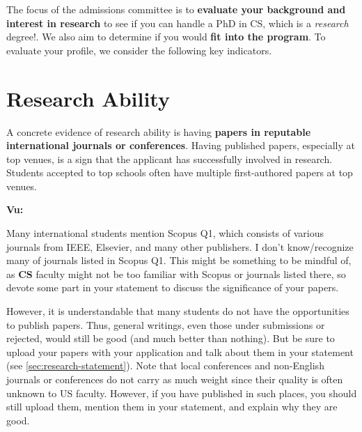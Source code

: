 \documentclass[oneside,11pt]{book}
\newenvironment{commentbox}[1][]{
  \small
  \begin{mybox}
    {\small \textbf{#1}}
  }{
  \end{mybox}
}
\begin{document}
The focus of the admissions committee is to \textbf{evaluate your background and interest in research} to see if you can handle a PhD in CS, which is a \emph{research} degree!. We also aim to determine if you would \textbf{fit into the program}. To evaluate your profile, we consider
the following key indicators.

\section{Research Ability}\label{sec:research-ability}

A concrete evidence of research ability is having \textbf{papers in reputable international journals or conferences}.
Having published papers, especially at top venues, is a sign that the applicant has successfully involved in research.  Students  accepted to top schools often have multiple first-authored papers at top venues. 

\begin{commentbox}[Vu:]
  Many international students mention Scopus Q1, which consists of various journals from IEEE, Elsevier, and many other publishers.  I don't know/recognize many of journals listed in Scopus Q1. This might be something to be mindful of, as \textbf{CS} faculty might not be too familiar with Scopus or journals listed there, so devote some part in your statement to discuss the significance of your papers.
\end{commentbox}

However, it is understandable that many students do not have the opportunities to publish papers. Thus, general writings, even those under submissions or rejected, would still be good (and much better than nothing).  But be sure to upload your papers with your application and talk about them in your statement (see \autoref{sec:research-statement}).  Note that local conferences and non-English journals or conferences do
not carry as much weight since their quality is often unknown to US faculty. However, if you have published in such places, you should still upload them, mention them in your statement, and explain why they are good.

\end{document}
